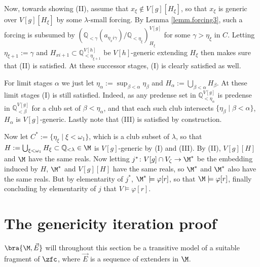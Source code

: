 {{		\qquad Now, towards showing (II), assume that $x_\xi\notin V[g][H_\xi]$, so that $x_\xi$ is generic over $V[g][H_\xi]$ by some $\lambda$-small forcing. By Lemma \ref{lemm.forcing3}, such a forcing is subsumed by $(\mathbb Q_{<\gamma}(a_{\eta_xi\gamma})/\mathbb Q_{<\eta_\xi})^{V[g]}_{H_\xi}$ for some $\gamma>\eta_\xi$ in $C$. Letting $\eta_{\xi+1}:=\gamma$ and $H_{xi+1}\subset\mathbb Q_{<\eta_{\xi+1}}^{V[h]}$ be $V[h]$-generic extending $H_\xi$ then makes sure that (II) is satisfied. At these successor stages, (I) is clearly satisfied as well.

		\qquad For limit stages $\alpha$ we just let $\eta_\alpha:=\sup_{\beta<\alpha}\eta_\beta$ and $H_\alpha:=\bigcup_{\beta<\alpha}H_\beta$. At these limit stages (I) is still satisfied. Indeed, as any predense set in $\mathbb Q_{<\eta_\alpha}^{V[g]}$ is predense in $\mathbb Q_{<\beta}^{V[g]}$ for a club set of $\beta<\eta_\alpha$, and that each such club intersects $\{\eta_\beta\mid\beta<\alpha\}$, $H_\alpha$ is $V[g]$-generic. Lastly note that (III) is satisfied by construction.
	}

	Now let $C^*:=\{\eta_\xi\mid\xi<\omega_1\}$, which is a club subset of $\lambda$, so that $H:=\bigcup_{\xi<\omega_1}H_\xi\subset\mathbb Q_{<\lambda}\in\M$ is $V[g]$-generic by (I) and (III). By (II), $V[g][H]$ and $\M$ have the same reals. Now letting $j^*\colon V[g]\cap V_\zeta\to\M^*$ be the embedding induced by $H$, $\M^*$ and $V[g][H]$ have the same reals, so $\M^*$ and $\M^*$ also have the same reals. But by elementarity of $j^*$, $\M^*\models\varphi[r]$, so that $\M\models\varphi[r]$, finally concluding by elementarity of $j$ that $V\models\varphi[r]$.
}


\pagebreak
\section{The genericity iteration proof}

$\bra{\M,\vec E}$ will throughout this section be a transitive model of a suitable fragment of $\zfc$, where $\vec E$ is a sequence of extenders in $\M$.


